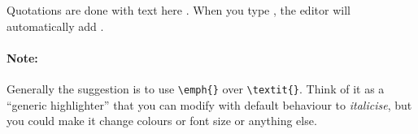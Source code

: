 Quotations are done with \textasciigrave\textasciigrave text here \textquotesingle\textquotesingle.
When you type \textasciigrave, the editor will automatically add \textquotesingle.

\paragraph{Note:} Generally the suggestion is to use \verb|\emph{}| over \verb|\textit{}|. Think of it as a ``generic highlighter'' that you can modify with default behaviour to \emph{italicise}, but you could make it change colours or font size or anything else.